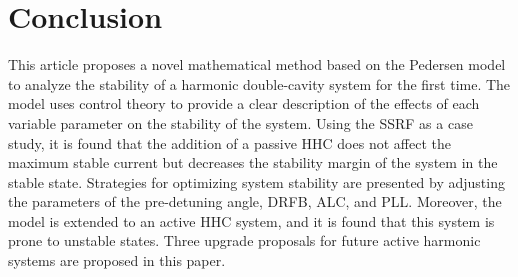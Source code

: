 \documentclass[letterpaper,
               nospread,     %
               ]{jacow}
\begin{document}
\section{Conclusion}
This article proposes a novel mathematical method based on the Pedersen model to analyze the stability of a harmonic double-cavity system for the first time. The model uses control theory to provide a clear description of the effects of each variable parameter on the stability of the system. Using the SSRF as a case study, it is found that the addition of a passive HHC does not affect the maximum stable current but decreases the stability margin of the system in the stable state. Strategies for optimizing system stability are presented by adjusting the parameters of the pre-detuning angle, DRFB, ALC, and PLL. Moreover, the model is extended to an active HHC system, and it is found that this system is prone to unstable states. Three upgrade proposals for future active harmonic systems are proposed in this paper.
\end{document}
